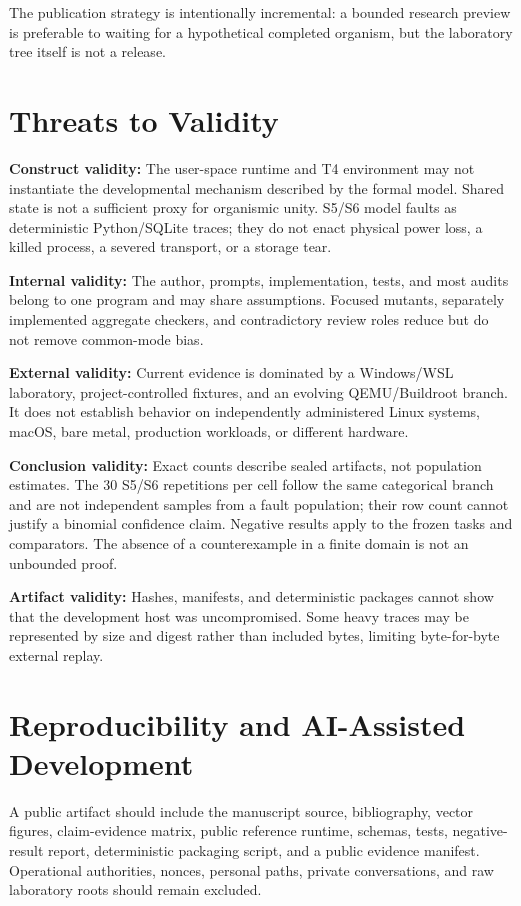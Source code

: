 \documentclass[journal,10pt]{IEEEtran}
\begin{document}
The publication strategy is intentionally incremental: a bounded research preview is preferable to waiting for a hypothetical completed organism, but the laboratory tree itself is not a release.

\section{Threats to Validity}
\textbf{Construct validity:} The user-space runtime and T4 environment may not instantiate the developmental mechanism described by the formal model. Shared state is not a sufficient proxy for organismic unity. S5/S6 model faults as deterministic Python/SQLite traces; they do not enact physical power loss, a killed process, a severed transport, or a storage tear.

\textbf{Internal validity:} The author, prompts, implementation, tests, and most audits belong to one program and may share assumptions. Focused mutants, separately implemented aggregate checkers, and contradictory review roles reduce but do not remove common-mode bias.

\textbf{External validity:} Current evidence is dominated by a Windows/WSL laboratory, project-controlled fixtures, and an evolving QEMU/Buildroot branch. It does not establish behavior on independently administered Linux systems, macOS, bare metal, production workloads, or different hardware.

\textbf{Conclusion validity:} Exact counts describe sealed artifacts, not population estimates. The 30 S5/S6 repetitions per cell follow the same categorical branch and are not independent samples from a fault population; their row count cannot justify a binomial confidence claim. Negative results apply to the frozen tasks and comparators. The absence of a counterexample in a finite domain is not an unbounded proof.

\textbf{Artifact validity:} Hashes, manifests, and deterministic packages cannot show that the development host was uncompromised. Some heavy traces may be represented by size and digest rather than included bytes, limiting byte-for-byte external replay.

\section{Reproducibility and AI-Assisted Development}
A public artifact should include the manuscript source, bibliography, vector figures, claim-evidence matrix, public reference runtime, schemas, tests, negative-result report, deterministic packaging script, and a public evidence manifest. Operational authorities, nonces, personal paths, private conversations, and raw laboratory roots should remain excluded.
\end{document}
